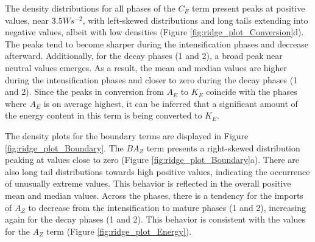 The density distributions for all phases of the $C_E$ term present peaks at positive values, near $3.5 W s^{-2}$, with left-skewed distributions and long tails extending into negative values, albeit with low densities (Figure \ref{fig:ridge_plot_Conversion}d). The peaks tend to become sharper during the intensification phases and decrease afterward. Additionally, for the decay phases (1 and 2), a broad peak near neutral values emerges. As a result, the mean and median values are higher during the intensification phases and closer to zero during the decay phases (1 and 2). Since the peaks in conversion from $A_E$ to $K_E$ coincide with the phases where $A_E$ is on average highest, it can be inferred that a significant amount of the energy content in this term is being converted to $K_E$.

The density plots for the boundary terms are displayed in Figure \ref{fig:ridge_plot_Boundary}. The $BA_Z$ term presents a right-skewed distribution peaking at values close to zero (Figure \ref{fig:ridge_plot_Boundary}a). There are also long tail distributions towards high positive values, indicating the occurrence of unusually extreme values. This behavior is reflected in the overall positive mean and median values. Across the phases, there is a tendency for the imports of $A_Z$ to decrease from the intensification to mature phases (1 and 2), increasing again for the decay phases (1 and 2). This behavior is consistent with the values for the $A_Z$ term (Figure \ref{fig:ridge_plot_Energy}).

